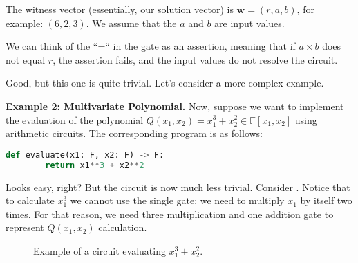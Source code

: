 \documentclass[../lecture-notes.tex]{subfiles}
\begin{document}
The witness vector (essentially, our solution vector) is $\mathbf{w} = (r, a, b)$, for example: $(6, 2, 3)$. We 
assume that the $a$ and $b$ are input values. 

We can think of the ``=`` in the gate as an assertion, meaning that if $a \times b$ does not equal
$r$, the assertion fails, and the input values do not resolve the circuit.

Good, but this one is quite trivial. Let's consider a more complex example.

\textbf{Example 2: Multivariate Polynomial.} Now, suppose we want to implement the evaluation of the polynomial $Q(x_1,x_2) = x_1^3 + x_2^2 \in \mathbb{F}[x_1,x_2]$ using arithmetic circuits. The corresponding program is as follows:
\begin{lstlisting}[language=Python,numbers=none]
    def evaluate(x1: F, x2: F) -> F:
        return x1**3 + x2**2
\end{lstlisting}

Looks easy, right? But the circuit is now much less trivial. Consider . Notice that to calculate $x_1^3$ we cannot use the single gate: we need to multiply $x_1$ by itself two times. For that reason, we need three multiplication and one addition gate to represent $Q(x_1,x_2)$ calculation.
\begin{figure}[h!]
    \centering
    \caption{Example of a circuit evaluating $x_1^3 + x_2^2$.}
    \label{fig:multivariate-polynomial-circuit}
\end{figure}
\end{document}
